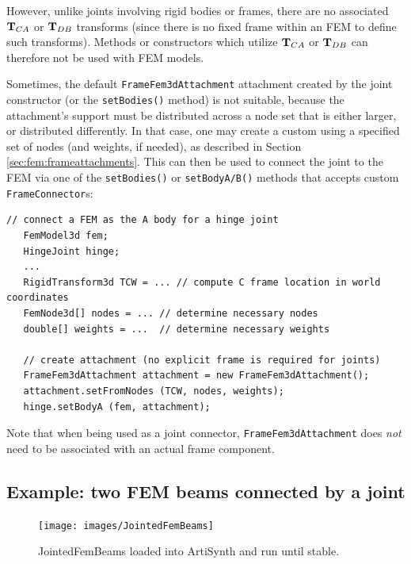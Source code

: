 However, unlike joints involving rigid bodies or frames, there are no
associated ${\bf T}_{CA}$ or ${\bf T}_{DB}$ transforms (since there is no fixed
frame within an FEM to define such transforms).  Methods or
constructors which utilize ${\bf T}_{CA}$ or ${\bf T}_{DB}$ can therefore
not be used with FEM models.

Sometimes, the default {\tt FrameFem3dAttachment} attachment created by the
joint constructor (or the {\tt setBodies()} method) is not suitable, because
the attachment's support must be distributed across a node set that is either
larger, or distributed differently. In that case, one may create a custom
using a specified set of nodes (and weights, if needed), as described in
Section \ref{sec:fem:frameattachments}. This can then be used to connect the
joint to the FEM via one of the {\tt setBodies()} or {\tt setBodyA/B()} methods
that accepts custom {\tt FrameConnector}s:
%
\begin{lstlisting}[]
   // connect a FEM as the A body for a hinge joint
   FemModel3d fem;
   HingeJoint hinge;
   ...
   RigidTransform3d TCW = ... // compute C frame location in world coordinates
   FemNode3d[] nodes = ... // determine necessary nodes
   double[] weights = ...  // determine necessary weights

   // create attachment (no explicit frame is required for joints)
   FrameFem3dAttachment attachment = new FrameFem3dAttachment();
   attachment.setFromNodes (TCW, nodes, weights);
   hinge.setBodyA (fem, attachment);   
\end{lstlisting}
%
Note that when being used as a joint connector, {\tt FrameFem3dAttachment} does
{\it not} need to be associated with an actual frame component.

\subsection{Example: two FEM beams connected by a joint}

\begin{figure}[ht]
	\centering
	\texttt{[image: images/JointedFemBeams]}
	\caption{JointedFemBeams loaded into ArtiSynth and run until stable.}
	\label{fig:fem:jointFemBeams}
\end{figure}


